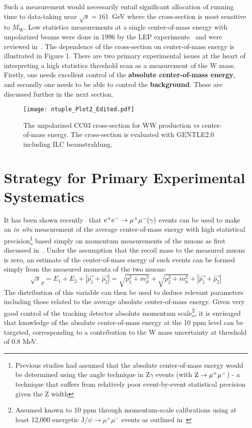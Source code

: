 \documentclass[12pt]{article}
\begin{document}
Such a measurement would necessarily entail significant allocation of running time to data-taking near $\sqrt{s}=161$~GeV where 
the cross-section is most sensitive to $M_{\mathrm{W}}$. 
Low statistics measurements at a single center-of-mass energy with unpolarized beams were done in 1996 
by the LEP experiments~\cite{ALEPH, DELPHI, L3, OPAL} and were reviewed in~\cite{Oxford-Primary,Oxford-Secondary}.
The dependence of the cross-section on center-of-mass energy is illustrated in Figure 1. 
There are two primary experimental issues at the heart of 
interpreting a high statistics threshold scan as a measurement of the W mass. Firstly, one needs excellent 
control of the {\bf absolute center-of-mass energy}, and secondly one needs to be able to control the {\bf background}.
These are discussed further in the next section.

\begin{figure}[!htb]
  \begin{center}
    \texttt{[image: ntuple\_Plot2\_Edited.pdf]} 
    \caption{The unpolarized CC03 cross-section for WW production vs center-of-mass energy. 
The cross-section is evaluated with GENTLE2.0 including ILC beamstrahlung.} 
    \label{fig:WWcrosssection}
  \end{center}
\end{figure}

\section*{Strategy for Primary Experimental Systematics}

It has been shown recently~\cite{Wilson-ECMP} that $\rm{e}^+\rm{e}^- \rightarrow \mu^+ \mu^- (\gamma)$ events can be used 
to make an {\it in situ} measurement of the average center-of-mass energy 
with high statistical precision\footnote{Previous studies 
had assumed that the absolute center-of-mass energy would be determined 
using the angle technique in Z$\gamma$ events (with $\rm{Z} \rightarrow \mu^+ \mu^-$) - a technique that 
suffers from relatively poor event-by-event statistical precision given the Z width} 
based simply on momentum measurements of the muons as first discussed in~\cite{Barklow-ECMP}.
Under the assumption that the recoil mass to the measured muons is zero, 
an estimate of the center-of-mass energy of such events can be formed simply from the measured momenta of the two muons:
\[ \sqrt{s}_P = E_1 + E_2 + |\vec{p_1} + \vec{p_2}| = \sqrt{p_1^2 + m_{\mu}^2} + \sqrt{p_2^2 + m_{\mu}^2} + |\vec{p_1} + \vec{p_2}|    \]
The distribution of this variable can then be used to deduce relevant parameters including those related to the 
average absolute center-of-mass energy.
Given very good control of the tracking detector absolute 
momentum scale\footnote{Assumed known to 10 ppm through momentum-scale calibrations using 
at least 12,000 energetic J/$\psi \rightarrow \mu^+ \mu^-$ events as outlined in~\cite{Wilson-JPsi}}, 
it is envisaged that knowledge of the absolute center-of-mass energy at the 10 ppm level can be targeted, corresponding to a 
contribution to the W mass uncertainty at threshold of 0.8 MeV.
\end{document}
